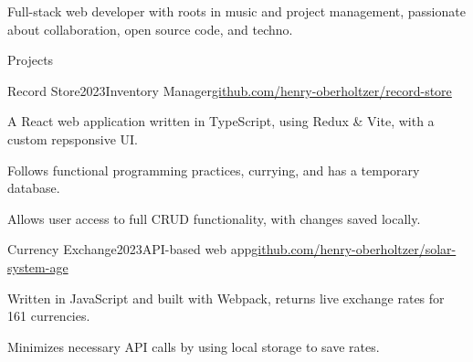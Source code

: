 \documentclass[
	11pt, %
]{resume} %
\begin{document}
\begin{flushleft}
	Full-stack web developer with roots in music and project management, passionate about collaboration, open source code, and techno. \hfill
\end{flushleft}

\begin{rSection}{Projects}
	\begin{rSubsection}{Record Store}{2023}{Inventory Manager}{\href{https://github.com/henry-oberholtzer/record-store}{github.com/henry-oberholtzer/record-store}}
		\item A React web application written in TypeScript, using Redux \& Vite, with a custom repsponsive UI.
		\item Follows functional programming practices, currying, and has a temporary database.
		\item Allows user access to full CRUD functionality, with changes saved locally.
	\end{rSubsection}
	\begin{rSubsection}{Currency Exchange}{2023}{API-based web app}{\href{https://github.com/henry-oberholtzer/solar-system-age}{github.com/henry-oberholtzer/solar-system-age}}
		\item Written in JavaScript and built with Webpack, returns live exchange rates for 161 currencies.
		\item Minimizes necessary API calls by using local storage to save rates.
	\end{rSubsection}
\end{rSection}
\end{document}
